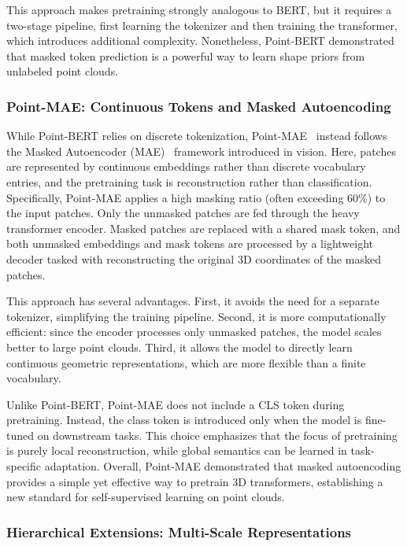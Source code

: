 This approach makes pretraining strongly analogous to BERT, but it requires a two-stage pipeline, first learning the tokenizer and then training the transformer, which introduces additional complexity. Nonetheless, Point-BERT demonstrated that masked token prediction is a powerful way to learn shape priors from unlabeled point clouds.

\subsubsection{Point-MAE: Continuous Tokens and Masked Autoencoding}

While Point-BERT relies on discrete tokenization, Point-MAE~\cite{pmae} instead follows the Masked Autoencoder (MAE)~\cite{mae} framework introduced in vision. Here, patches are represented by continuous embeddings rather than discrete vocabulary entries, and the pretraining task is reconstruction rather than classification. Specifically, Point-MAE applies a high masking ratio (often exceeding 60\%) to the input patches. Only the unmasked patches are fed through the heavy transformer encoder. Masked patches are replaced with a shared mask token, and both unmasked embeddings and mask tokens are processed by a lightweight decoder tasked with reconstructing the original 3D coordinates of the masked patches.

This approach has several advantages. First, it avoids the need for a separate tokenizer, simplifying the training pipeline. Second, it is more computationally efficient: since the encoder processes only unmasked patches, the model scales better to large point clouds. Third, it allows the model to directly learn continuous geometric representations, which are more flexible than a finite vocabulary.

Unlike Point-BERT, Point-MAE does not include a CLS token during pretraining. Instead, the class token is introduced only when the model is fine-tuned on downstream tasks. This choice emphasizes that the focus of pretraining is purely local reconstruction, while global semantics can be learned in task-specific adaptation. Overall, Point-MAE demonstrated that masked autoencoding provides a simple yet effective way to pretrain 3D transformers, establishing a new standard for self-supervised learning on point clouds.

\subsubsection{Hierarchical Extensions: Multi-Scale Representations}
\label{sssec:hierarchical_extensions}

